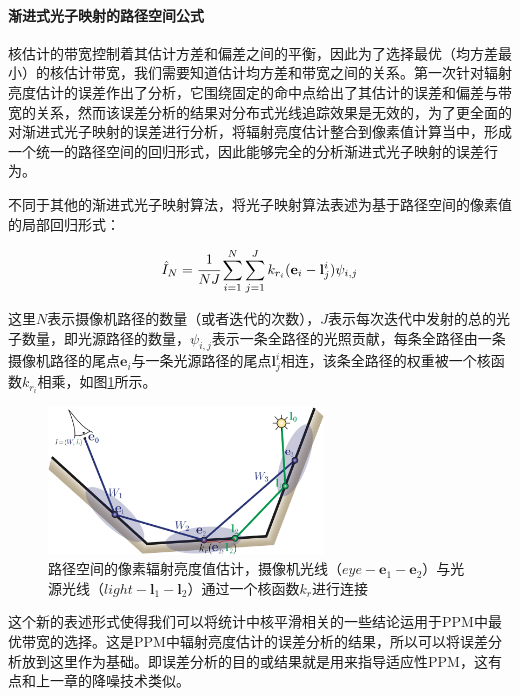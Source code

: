 \paragraph{渐进式光子映射的路径空间公式}
核估计的带宽控制着其估计方差和偏差之间的平衡，因此为了选择最优（均方差最小）的核估计带宽，我们需要知道估计均方差和带宽之间的关系。\cite{a:AProgressiveErrorEstimationFrameworkforPhotonDensityEstimation}第一次针对辐射亮度估计的误差作出了分析，它围绕固定的命中点给出了其估计的误差和偏差与带宽的关系，然而该误差分析的结果对分布式光线追踪效果是无效的，为了更全面的对渐进式光子映射的误差进行分析，\cite{a:AdaptiveProgressivePhotonMapping}将辐射亮度估计整合到像素值计算当中，形成一个统一的路径空间的回归形式，因此能够完全的分析渐进式光子映射的误差行为。

不同于其他的渐进式光子映射算法，\cite{a:AdaptiveProgressivePhotonMapping}将光子映射算法表述为基于路径空间的像素值的局部回归形式：

\begin{equation}
	\hat{I}_N= \cfrac{1}{NJ}\sum^{N}_{i=1}\sum^{J}_{j=1}k_{r_i}(\mathbf{e}_i-\mathbf{l}^{i}_j)\psi_{i,j}
\end{equation}

这里$N$表示摄像机路径的数量（或者迭代的次数），$J$表示每次迭代中发射的总的光子数量，即光源路径的数量，$\psi_{i,j}$表示一条全路径的光照贡献，每条全路径由一条摄像机路径的尾点$\mathbf{e}_i$与一条光源路径的尾点$\mathbf{l}^{i}_{j}$相连，该条全路径的权重被一个核函数$k_{r_i}$相乘，如图\ref{f:pm-path-space}所示。

\begin{figure}
	\sidecaption
	\includegraphics[width=0.65\textwidth]{figures/pm/path-space-estimation}
	\caption{路径空间的像素辐射亮度值估计，摄像机光线（$eye-\mathbf{e}_1-\mathbf{e}_2$）与光源光线（$light-\mathbf{l}_1-\mathbf{l}_2$）通过一个核函数$k_r$进行连接}
	\label{f:pm-path-space}
\end{figure}

这个新的表述形式使得我们可以将统计中核平滑相关的一些结论运用于PPM中最优带宽的选择。这是PPM中辐射亮度估计的误差分析的结果，所以可以将误差分析放到这里作为基础。即误差分析的目的或结果就是用来指导适应性PPM，这有点和上一章的降噪技术类似。

